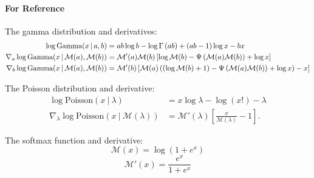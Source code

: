 \paragraph{For Reference}
The gamma distribution and derivatives:
\begin{align}
\log\mbox{Gamma}(x \, | \, a,b) & = ab\log b - \log\Gamma \left(ab\right) +(ab-1)\log x - bx \label{eq:gamma}\\
\nabla_a \log\mbox{Gamma}(x \, | \, \mathcal{M}(a), \mathcal{M}(b)) &= 
\mathcal{M}'(a) \mathcal{M}(b) \left[ \log \mathcal{M}(b) - \Psi \left(\mathcal{M}(a)\mathcal{M}(b)\right) + \log x\right] \label{eq:dgammaA}
\\
\nabla_b \log\mbox{Gamma}(x \, | \, \mathcal{M}(a), \mathcal{M}(b)) &= 
\mathcal{M}'(b) \left[ \mathcal{M}(a) \left((\log \mathcal{M}(b) + 1) - \Psi \left(\mathcal{M}(a)\mathcal{M}(b)\right) + \log x\right) - x\right]\label{eq:dgammaB}
\end{align}

The Poisson distribution and derivative:
\begin{align}
\log\mbox{Poisson}(x~\vert~\lambda) &= x\log\lambda - \log(x!) - \lambda \label{eq:poisson} \\
\nabla_\lambda \log\mbox{Poisson}(x~\vert~\mathcal{M}(\lambda)) &= \mathcal{M}'(\lambda)\left[\frac{x}{\mathcal{M}(\lambda)} -1\right].\label{eq:dpoisson}
\end{align}

The softmax function and derivative:
\[\mathcal{M}(x) = \log(1+e^x)\]
\[\mathcal{M}'(x) = \frac{e^x}{1+e^x}\]


